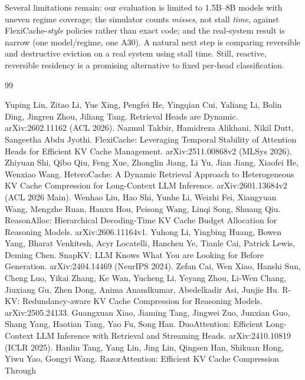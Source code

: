 \documentclass{article}
\begin{document}
Several limitations remain: our evaluation is limited to 1.5B--8B models with
uneven regime coverage; the simulator counts \emph{misses}, not stall
\emph{time}, against FlexiCache-\emph{style} policies rather than
exact code; and the real-system result is narrow (one model/regime,
one A30). A natural next step is comparing reversible and destructive
eviction on a real system using stall time. Still, reactive, reversible
residency is a promising alternative to fixed per-head classification.

\clearpage
\begin{thebibliography}{99}

    Yuping Lin, Zitao Li, Yue Xing, Pengfei He, Yingqian Cui, Yaliang Li,
    Bolin Ding, Jingren Zhou, Jiliang Tang. Retrieval Heads are Dynamic.
    arXiv:2602.11162 (ACL 2026).
    Nazmul Takbir, Hamidreza Alikhani, Nikil Dutt, Sangeetha Abdu Jyothi.
    FlexiCache: Leveraging Temporal Stability of Attention Heads for
    Efficient KV Cache Management. arXiv:2511.00868v2 (MLSys 2026).
    Zhiyuan Shi, Qibo Qiu, Feng Xue, Zhonglin Jiang, Li Yu, Jian Jiang,
    Xiaofei He, Wenxiao Wang. HeteroCache: A Dynamic Retrieval Approach
    to Heterogeneous KV Cache Compression for Long-Context LLM
    Inference. arXiv:2601.13684v2 (ACL 2026 Main).
    Wenhao Liu, Hao Shi, Yunhe Li, Weizhi Fei, Xiangyuan Wang, Mengzhe
    Ruan, Hanxu Hou, Peisong Wang, Linqi Song, Shuang Qiu. ReasonAlloc:
    Hierarchical Decoding-Time KV Cache Budget Allocation for Reasoning
    Models. arXiv:2606.11164v1.
    Yuhong Li, Yingbing Huang, Bowen Yang, Bharat Venkitesh, Acyr
    Locatelli, Hanchen Ye, Tianle Cai, Patrick Lewis, Deming Chen.
    SnapKV: LLM Knows What You are Looking for Before Generation.
    arXiv:2404.14469 (NeurIPS 2024).
    Zefan Cai, Wen Xiao, Hanshi Sun, Cheng Luo, Yikai Zhang, Ke Wan,
    Yucheng Li, Yeyang Zhou, Li-Wen Chang, Jiuxiang Gu, Zhen Dong, Anima
    Anandkumar, Abedelkadir Asi, Junjie Hu. R-KV: Redundancy-aware KV
    Cache Compression for Reasoning Models. arXiv:2505.24133.
    Guangxuan Xiao, Jiaming Tang, Jingwei Zuo, Junxian Guo, Shang Yang,
    Haotian Tang, Yao Fu, Song Han. DuoAttention: Efficient Long-Context
    LLM Inference with Retrieval and Streaming Heads. arXiv:2410.10819
    (ICLR 2025).
    Hanlin Tang, Yang Lin, Jing Lin, Qingsen Han, Shikuan Hong, Yiwu Yao,
    Gongyi Wang. RazorAttention: Efficient KV Cache Compression Through

\end{thebibliography}
\end{document}
